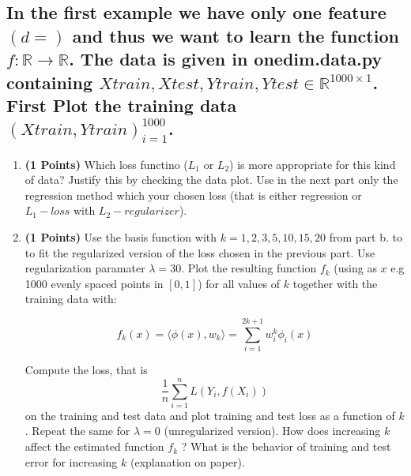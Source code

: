 \documentclass{./tufte-handout}
\begin{document}
\subsection{
In the first example we have only one feature $(d = )$ 
and thus we want to learn the function $f: \mathbb{R} \to \mathbb{R}$. 
The data is given in \textbf{onedim.data.py} containing $Xtrain, Xtest, Ytrain, Ytest \in \mathbb{R}^{1000 \times 1}$. First Plot 
the training data $(Xtrain, Ytrain)_{i=1}^{1000}$. }
\begin{enumerate}
    \item \textbf{(1 Points)} Which loss functino ($L_1$ or $L_2$) is more appropriate for this
   kind of data? Justify this by checking the data plot.  Use in the next part only the regression method
   which your chosen loss (that is either regression or $L_1-loss$ with $L_2-regularizer$).
    \item \textbf{(1 Points)} Use the basis function with $k=1, 2, 3, 5, 10, 15, 20$ from part b. to 
   to fit the regularized version of the loss chosen in the previous part. Use regularization paramater $\lambda = 30$. 
   Plot the resulting function $f_k$ (using as $x$ e.g 1000 evenly spaced points in $[0, 1]$) for all values
   of $k$ together with the training data with: 

   \begin{equation}
        f_k(x)  = \langle \phi(x), w_k \rangle = \sum_{i=1}^{2k+1} w_i^k \phi_{i}(x)
   \end{equation}

   Compute the loss, that is 
   \begin{equation}
    \frac{1}{n}  \sum_{i=1}^n L(Y_i, f(X_i))
   \end{equation}
   on the training and test data and plot training and test loss as a function of $k$.
   Repeat the same for $\lambda =0$ (unregularized version). How does increasing 
   $k$ affect the estimated function $f_k$ ? What is the behavior of training and 
   test error for increasing   $k$ (explanation on paper). 

\end{enumerate}
\end{document}
